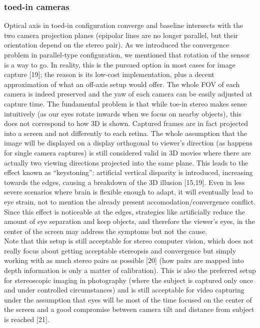 \subsubsection{toed-in cameras}
Optical axis in toed-in configuration converge and baseline intersects with the two camera projection planes (epipolar lines are no longer parallel, but their orientation depend on the stereo pair). As we introduced the convergence problem in parallel-type configuration, we mentioned that rotation of the sensor is a way to go. In reality, this is the pursued option in most cases for image capture [19]; the reason is its low-cost implementation, plus a decent approximation of what an off-axis setup would offer. The whole FOV of each camera is indeed preserved and the yaw of each camera can be easily adjusted at capture time. The fundamental problem is that while toe-in stereo makes sense intuitively (as our eyes rotate inwards when we focus on nearby objects), this does not correspond to how 3D is shown. Captured frames are in fact projected into a screen and not differently to each retina. The whole assumption that the image will be displayed on a display orthogonal to viewer’s direction (as happens for single camera captures) is still considered valid in 3D movies where there are actually two viewing directions projected into the same plane. This leads to the effect known as “keystoning”: artificial vertical disparity is introduced, increasing towards the edges, causing a breakdown of the 3D illusion [15,19]. Even in less severe scenarios where brain is flexible enough to adapt, it will eventually lead to eye strain, not to mention the already present accomodation/convergence conflict. Since this effect is noticeable at the edges, strategies like artificially reduce the amount of eye separation and keep objects, and therefore the viewer’s eyes, in the center of the screen may address the symptoms but not the cause.\\
Note that this setup is still acceptable for stereo computer vision, which does not really focus about getting acceptable stereopsis and convergence but simply working with as much stereo pairs as possible [20] (how pairs are mapped into depth information is only a matter of calibration). This is also the preferred setup for stereoscopic imaging in photography (where the subject is captured only once and under controlled circumstances) and is still acceptable for video capturing under the assumption that eyes will be most of the time focused on the center of the screen and a good compromise between camera tilt and distance from subject is reached [21].

